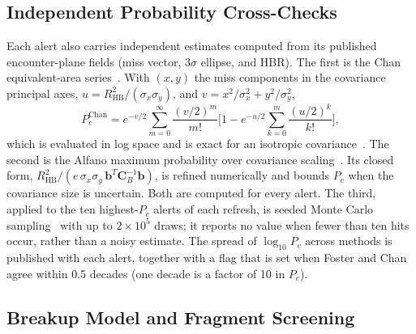 \documentclass[conference]{IEEEtran}
\newcommand{\Pc}{P_c}
\newcommand{\bvec}[1]{\mathbf{#1}}
\newcommand{\HBR}{R_{\mathrm{HB}}}
\begin{document}
\subsection{Independent Probability Cross-Checks}

Each alert also carries independent estimates computed from its published
encounter-plane fields (miss vector, $3\sigma$ ellipse, and HBR). The first is
the Chan equivalent-area series~\cite{chan2008}. With $(x,y)$ the miss
components in the covariance principal axes,
$u=\HBR^{2}/(\sigma_x\sigma_y)$, and $v=x^{2}/\sigma_x^{2}+y^{2}/\sigma_y^{2}$,
\begin{equation}
  \Pc^{\mathrm{Chan}}=e^{-v/2}\sum_{m=0}^{\infty}\frac{(v/2)^m}{m!}
  \Big[1-e^{-u/2}\sum_{k=0}^{m}\frac{(u/2)^k}{k!}\Big],
\label{eq:chan}
\end{equation}
which is evaluated in log space and is exact for an isotropic
covariance~\cite{chan2008}. The second is the Alfano maximum probability over
covariance scaling~\cite{alfano2005b}. Its closed form,
$\HBR^{2}/(e\,\sigma_x\sigma_y\,\bvec{b}^{T}\bvec{C}_B^{-1}\bvec{b})$, is
refined numerically and bounds $\Pc$ when the covariance size is uncertain.
Both are computed for every alert. The third, applied to the ten highest-$\Pc$
alerts of each refresh, is seeded Monte Carlo sampling~\cite{hall2018} with up
to $2\times10^{5}$ draws; it reports no value when fewer than ten hits occur,
rather than a noisy estimate. The spread of $\log_{10}\Pc$ across methods is
published with each alert, together with a flag that is set when Foster and
Chan agree within 0.5 decades (one decade is a factor of 10 in $\Pc$).

\subsection{Breakup Model and Fragment Screening}
\end{document}
